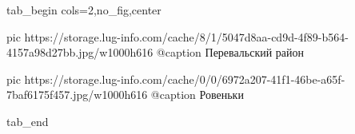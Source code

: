  
 
 
 
 


\ifcmt
  tab_begin cols=2,no_fig,center

     pic https://storage.lug-info.com/cache/8/1/5047d8aa-cd9d-4f89-b564-4157a98d27bb.jpg/w1000h616
		 @caption Перевальский район

		 pic https://storage.lug-info.com/cache/0/0/6972a207-41f1-46be-a65f-7baf6175f457.jpg/w1000h616
		 @caption Ровеньки

  tab_end
\fi
